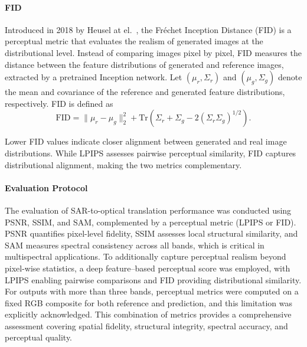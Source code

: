\paragraph{FID} 
Introduced in 2018 by Heusel at el.~\cite{iqa_fid}, the Fréchet Inception Distance (FID) is a perceptual metric that evaluates the realism of generated images at the distributional level. Instead of comparing images pixel by pixel, FID measures the distance between the feature distributions of generated and reference images, extracted by a pretrained Inception network. Let $(\mu_r, \Sigma_r)$ and $(\mu_g, \Sigma_g)$ denote the mean and covariance of the reference and generated feature distributions, respectively. FID is defined as
\begin{equation}
\text{FID} = \| \mu_r - \mu_g \|_2^2 + \text{Tr}\left( \Sigma_r + \Sigma_g - 2(\Sigma_r \Sigma_g)^{1/2} \right).
\end{equation}

Lower FID values indicate closer alignment between generated and real image distributions. While LPIPS assesses pairwise perceptual similarity, FID captures distributional alignment, making the two metrics complementary.


\paragraph{Evaluation Protocol}
The evaluation of SAR-to-optical translation performance was conducted using PSNR, SSIM, and SAM, complemented by a perceptual metric (LPIPS or FID). PSNR quantifies pixel-level fidelity, SSIM assesses local structural similarity, and SAM measures spectral consistency across all bands, which is critical in multispectral applications. To additionally capture perceptual realism beyond pixel-wise statistics, a deep feature–based perceptual score was employed, with LPIPS enabling pairwise comparisons and FID providing distributional similarity. For outputs with more than three bands, perceptual metrics were computed on a fixed RGB composite for both reference and prediction, and this limitation was explicitly acknowledged. This combination of metrics provides a comprehensive assessment covering spatial fidelity, structural integrity, spectral accuracy, and perceptual quality.

